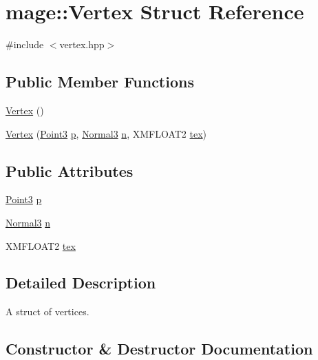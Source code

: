 \hypertarget{structmage_1_1_vertex}{}\section{mage\+:\+:Vertex Struct Reference}
\label{structmage_1_1_vertex}


{\ttfamily \#include $<$vertex.\+hpp$>$}

\subsection*{Public Member Functions}
\begin{DoxyCompactItemize}
\item 
\hyperlink{structmage_1_1_vertex_a8bf3578fcb5595eab057dc2d1f916dce}{Vertex} ()
\item 
\hyperlink{structmage_1_1_vertex_a31e94fb64ca1ae316dba92b3f0e80806}{Vertex} (\hyperlink{structmage_1_1_point3}{Point3} \hyperlink{structmage_1_1_vertex_a10d9682b2189fedd905b2597f345cfeb}{p}, \hyperlink{structmage_1_1_normal3}{Normal3} \hyperlink{structmage_1_1_vertex_abeb6b66a8c12463ef24248ec30729888}{n}, X\+M\+F\+L\+O\+A\+T2 \hyperlink{structmage_1_1_vertex_a85ae82408f02d64ae567a74efe151188}{tex})
\end{DoxyCompactItemize}
\subsection*{Public Attributes}
\begin{DoxyCompactItemize}
\item 
\hyperlink{structmage_1_1_point3}{Point3} \hyperlink{structmage_1_1_vertex_a10d9682b2189fedd905b2597f345cfeb}{p}
\item 
\hyperlink{structmage_1_1_normal3}{Normal3} \hyperlink{structmage_1_1_vertex_abeb6b66a8c12463ef24248ec30729888}{n}
\item 
X\+M\+F\+L\+O\+A\+T2 \hyperlink{structmage_1_1_vertex_a85ae82408f02d64ae567a74efe151188}{tex}
\end{DoxyCompactItemize}


\subsection{Detailed Description}
A struct of vertices. 

\subsection{Constructor \& Destructor Documentation}
\hypertarget{structmage_1_1_vertex_a8bf3578fcb5595eab057dc2d1f916dce}{}\label{structmage_1_1_vertex_a8bf3578fcb5595eab057dc2d1f916dce} 
